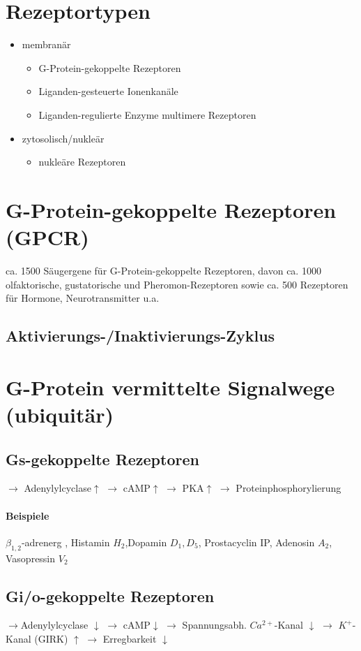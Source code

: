 \documentclass[10pt,a4paper]{report}
\begin{document}
\section{Rezeptortypen}
\begin{itemize}
	\item membranär
	\begin{itemize}
		\item G-Protein-gekoppelte Rezeptoren
		\item Liganden-gesteuerte Ionenkanäle
		\item Liganden-regulierte Enzyme
			multimere Rezeptoren 
	\end{itemize}
	\item zytosolisch/nukleär
	\begin{itemize}
		\item nukleäre Rezeptoren
	\end{itemize}
\end{itemize}
\section{G-Protein-gekoppelte Rezeptoren (GPCR)}
ca. 1500 Säugergene für G-Protein-gekoppelte Rezeptoren, davon ca. 1000 olfaktorische, gustatorische und Pheromon-Rezeptoren sowie ca. 500 Rezeptoren für Hormone, Neurotransmitter u.a.
\subsection{Aktivierungs-/Inaktivierungs-Zyklus}
\section{G-Protein vermittelte Signalwege (ubiquitär)}
\subsection{Gs-gekoppelte Rezeptoren}
$\rightarrow$ Adenylylcyclase$\uparrow$ $\rightarrow$ cAMP$\uparrow$ $\rightarrow$ PKA$\uparrow$ $\rightarrow$ Proteinphosphorylierung
\paragraph{Beispiele}
$\beta_{1,2}$-adrenerg	, Histamin $H_2$,Dopamin $D_1,D_5$, Prostacyclin IP, Adenosin $A_2$, Vasopressin $V_2$
\subsection{Gi/o-gekoppelte Rezeptoren}
$\rightarrow$Adenylylcyclase $\downarrow$ $\rightarrow$ cAMP$\downarrow$
$\rightarrow$ Spannungsabh. $Ca^{2+}$-Kanal $\downarrow$ 
$\rightarrow$ $K^+$-Kanal (GIRK) $\uparrow$
$\rightarrow$ Erregbarkeit $\downarrow$
\end{document}

